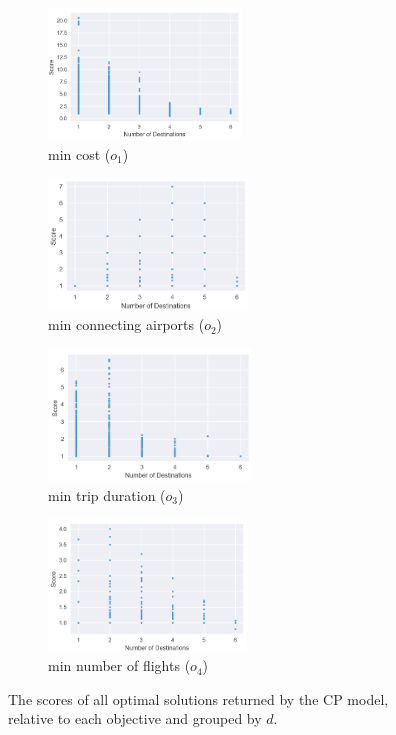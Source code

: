 \documentclass{mpaper}
\begin{document}
\begin{figure}[!ht]
    \centering
    \begin{subfigure}[b]{0.24\textwidth}
        \includegraphics[width=\textwidth, height=3.5cm]{cost_cp.png}
        \caption{min cost ($o_1$)}
        \label{costcp}
    \end{subfigure}
    \begin{subfigure}[b]{0.24\textwidth}
        \includegraphics[width=\textwidth, height=3.5cm]{connair_cp.png}
        \caption{min connecting airports ($o_2$)}
        \label{airportscp}
    \end{subfigure}
    \begin{subfigure}[b]{0.24\textwidth}
        \includegraphics[width=\textwidth, height=3.5cm]{trip_cp.png}
        \caption{min trip duration ($o_3$)}
        \label{tripcp}
    \end{subfigure}
    \begin{subfigure}[b]{0.24\textwidth}
        \includegraphics[width=\textwidth, height=3.5cm]{flights_cp.png}
        \caption{min number of flights ($o_4$)}
        \label{flightscp}
    \end{subfigure}
    \caption{The scores of all optimal solutions returned by the CP model, relative to each objective and grouped by $d$.}
    \label{fig:cpmultiobj}
\end{figure}
\end{document}
